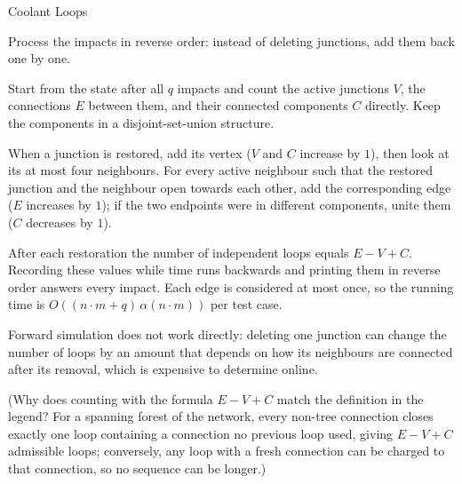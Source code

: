 \begin{tutorial}{Coolant Loops}

Process the impacts in reverse order: instead of deleting junctions, add them back one by one.

Start from the state after all $q$ impacts and count the active junctions $V$, the connections $E$ between them, and their connected components $C$ directly. Keep the components in a disjoint-set-union structure.

When a junction is restored, add its vertex ($V$ and $C$ increase by $1$), then look at its at most four neighbours. For every active neighbour such that the restored junction and the neighbour open towards each other, add the corresponding edge ($E$ increases by $1$); if the two endpoints were in different components, unite them ($C$ decreases by $1$).

After each restoration the number of independent loops equals $E - V + C$. Recording these values while time runs backwards and printing them in reverse order answers every impact. Each edge is considered at most once, so the running time is $O((n \cdot m + q)\, \alpha(n \cdot m))$ per test case.

Forward simulation does not work directly: deleting one junction can change the number of loops by an amount that depends on how its neighbours are connected after its removal, which is expensive to determine online.

(Why does counting with the formula $E - V + C$ match the definition in the legend? For a spanning forest of the network, every non-tree connection closes exactly one loop containing a connection no previous loop used, giving $E - V + C$ admissible loops; conversely, any loop with a fresh connection can be charged to that connection, so no sequence can be longer.)


\end{tutorial}
